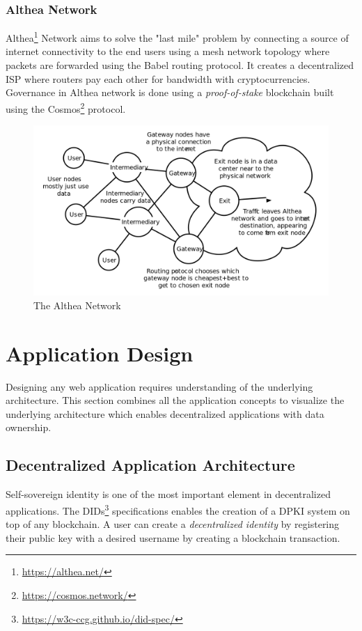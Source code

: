 		\subsubsection{Althea Network}
		Althea\footnote{\url{https://althea.net/}} Network aims to solve the "last mile" problem by connecting a source of internet connectivity to the end users using a mesh network topology where packets are forwarded using the Babel routing protocol\cite{chroboczek2011babel}. It creates a decentralized ISP where routers pay each other for bandwidth with cryptocurrencies. Governance in Althea network is done using a \textit{proof-of-stake} blockchain built using the Cosmos\footnote{\url{https://cosmos.network/}} protocol.
		
		\begin{figure}[h]
			\includegraphics[width=\linewidth]{figures/althea-network}
			\caption{\label{fig:althea-network} The Althea Network\protect\footnotemark}
		\end{figure}
	
\section{Application Design}
	Designing any web application requires understanding of the underlying architecture. This section combines all the application concepts to visualize the underlying architecture which enables decentralized applications with data ownership.
	
	\subsection{Decentralized Application Architecture}
	Self-sovereign identity is one of the most important element in decentralized applications.  The DIDs\footnote{\url{https://w3c-ccg.github.io/did-spec/}} specifications enables the creation of a DPKI system on top of any blockchain. A user can create a \textit{decentralized identity} by registering their public key with a desired username by creating a blockchain transaction.
	
